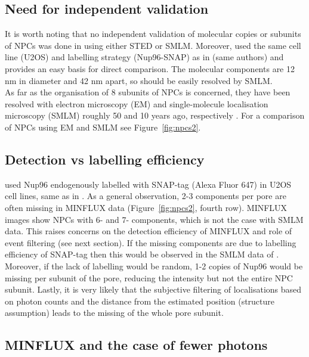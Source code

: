\documentclass[9pt,twocolumn,twoside]{pnas-new}
\begin{document}
\subsection{Need for independent validation}
It is worth noting that no independent validation of molecular copies or subunits of NPCs was done in \cite{gwosch2020minflux} using either STED or SMLM. Moreover, \cite{thevathasan2019nuclear} used the same cell line (U2OS) and labelling strategy (Nup96-SNAP) as in \cite{gwosch2020minflux} (same authors) and provides an easy basis for direct comparison. The molecular components are 12 nm in diameter and 42 nm apart, so should be easily resolved by SMLM. \\
As far as the organisation of 8 subunits of NPCs is concerned, they have been resolved with electron microscopy (EM) and single-molecule localisation microscopy (SMLM) roughly 50 and 10 years ago, respectively \citep{gall1967octagonal, loschberger2012super}. For a comparison of NPCs using EM and SMLM see Figure~\ref{fig:npcs2}. 

\subsection{Detection vs labelling efficiency}

\cite{gwosch2020minflux} used Nup96 endogenously labelled with SNAP-tag (Alexa Fluor 647) in U2OS cell lines, same as in \cite{thevathasan2019nuclear}. As a general observation, 2-3 components per pore are often missing in MINFLUX data (Figure~\ref{fig:npcs2}, fourth row). MINFLUX images show NPCs with 6- and 7- components, which is not the case with SMLM data. This raises concerns on the detection efficiency of MINFLUX and role of event filtering (see next section). If the missing components are due to labelling efficiency of SNAP-tag then this would be observed in the SMLM data of \cite{thevathasan2019nuclear}. Moreover, if the lack of labelling would be random, 1-2 copies of Nup96 would be missing per subunit of the pore, reducing the intensity but not the entire NPC subunit. Lastly, it is very likely that the subjective filtering of localisations based on photon counts and the distance from the estimated position (structure assumption) leads to the missing of the whole pore subunit. 

\subsection{MINFLUX and the case of fewer photons}
\end{document}
